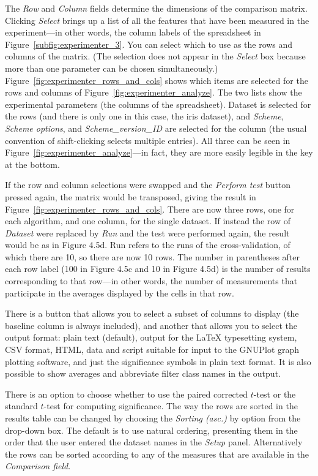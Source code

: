 The \textit{Row} and \textit{Column} fields determine the dimensions
of the comparison matrix. Clicking \textit{Select} brings up a list of
all the features that have been measured in the experiment---in other
words, the column labels of the spreadsheet in
Figure~\ref{subfig:experimenter_3}. You can select which to use as the
rows and columns of the matrix. (The selection does not appear in the
\textit{Select} box because more than one parameter can be chosen
simultaneously.) Figure~\ref{fig:experimenter_rows_and_cols} shows
which items are selected for the rows and columns of
Figure~\ref{fig:experimenter_analyze}. The two lists show the
experimental parameters (the columns of the spreadsheet). Dataset is
selected for the rows (and there is only one in this case, the iris
dataset), and \textit{Scheme}, \textit{Scheme options}, and
\textit{Scheme\_version\_ID} are selected for the column (the usual
convention of shift-clicking selects multiple entries). All three can
be seen in Figure~\ref{fig:experimenter_analyze}---in fact, they are
more easily legible in the key at the bottom.

If the row and column selections were swapped and the \textit{Perform
  test} button pressed again, the matrix would be transposed, giving
the result in Figure~\ref{fig:experimenter_rows_and_cols}. There
are now three rows, one for each algorithm, and one column, for the
single dataset. If instead the row of \textit{Dataset} were replaced
by \textit{Run} and the test were performed again, the result would be
as in Figure 4.5d. Run refers to the runs of the cross-validation, of
which there are 10, so there are now 10 rows. The number in
parentheses after each row label (100 in Figure 4.5c and 10 in Figure
4.5d) is the number of results corresponding to that row—in other
words, the number of measurements that participate in the averages
displayed by the cells in that row.

There is a button that allows you to select a subset of columns to
display (the baseline column is always included), and another that
allows you to select the output format: plain text (default), output
for the LaTeX typesetting system, CSV format, HTML, data and script
suitable for input to the GNUPlot graph plotting software, and just
the significance symbols in plain text format. It is also possible to
show averages and abbreviate filter class names in the output.

There is an option to choose whether to use the paired corrected
$t$-test or the standard $t$-test for computing significance. The way
the rows are sorted in the results table can be changed by choosing
the \textit{Sorting (asc.)} by option from the drop-down box. The
default is to use natural ordering, presenting them in the order that
the user entered the dataset names in the \textit{Setup}
panel. Alternatively the rows can be sorted according to any of the
measures that are available in the \textit{Comparison field}.

